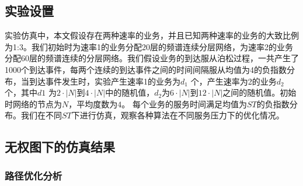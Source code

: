\subsection{实验设置}
实验仿真中，本文假设存在两种速率的业务，并且已知两种速率的业务的大致比例为1:3。我们初始时为速率1的业务分配20层的频谱连续分层网络，为速率2的业务分配60层的频谱连续的分层网络。我们假设业务的到达服从泊松过程，一共产生了1000个到达事件，每两个连续的到达事件之间的时间间隔服从均值为4的负指数分布，当到达事件发生时，实验产生速率1的业务为$d_1$ 个，产生速率为2的业务$d_2$ 个，其中$d1$ 为$2 \cdot |N|$到$4 \cdot|N|$中的随机值，$d_2$为$6 \cdot |N|$到$12 \cdot |N|$之间的随机值。初始时网络的节点为$N$，平均度数为$4$。 每个业务的服务时间满足均值为$ST$的负指数分布。我们在不同$ST$下进行仿真，观察各种算法在不同服务压力下的优化情况。

\subsection{无权图下的仿真结果}
\subsubsection{路径优化分析}

